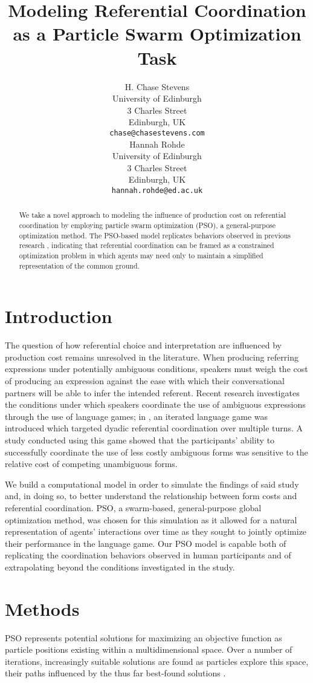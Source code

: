 \documentclass[a4paper,11pt]{article}
\title{Modeling Referential Coordination as a Particle Swarm Optimization Task}
\author{H. Chase Stevens \\
  University of Edinburgh \\
  3 Charles Street \\
  Edinburgh, UK \\
  {\tt chase@chasestevens.com} \\\And
  Hannah Rohde \\
  University of Edinburgh \\
  3 Charles Street \\
  Edinburgh, UK \\
  {\tt hannah.rohde@ed.ac.uk} \\}
\date{}
\begin{document}
\maketitle
\begin{abstract}
We take a novel approach to modeling the influence of production cost on referential coordination by employing particle swarm optimization (PSO), a general-purpose optimization method. The PSO-based model replicates behaviors observed in previous research \cite{rohde2012,brennan1996}, indicating that referential coordination can be framed as a constrained optimization problem in which agents may need only to maintain a simplified representation of the common ground.
\end{abstract}

\section{Introduction}
The question of how referential choice and interpretation are influenced by production cost remains unresolved in the literature. When producing referring expressions under potentially ambiguous conditions, speakers must weigh the cost of producing an expression against the ease with which their conversational partners will be able to infer the intended referent. Recent research \cite{rohde2012,degen2012,frank2012} investigates the conditions under which speakers coordinate the use of ambiguous expressions through the use of language games; in \citeauthor{rohde2012}, an iterated language game was introduced which targeted dyadic referential coordination over multiple turns. A study conducted using this game showed that the participants' ability to successfully coordinate the use of less costly ambiguous forms was sensitive to the relative cost of competing unambiguous forms.

We build a computational model in order to simulate the findings of said study and, in doing so, to better understand the relationship between form costs and referential coordination. PSO, a swarm-based, general-purpose global optimization method, was chosen for this simulation as it allowed for a natural representation of agents' interactions over time as they sought to jointly optimize their performance in the language game. Our PSO model is capable both of replicating the coordination behaviors observed in human participants and of extrapolating beyond the conditions investigated in the \citeauthor{rohde2012} study.

\section{Methods}
PSO represents potential solutions for maximizing an objective function as particle positions existing within a multidimensional space. Over a number of iterations, increasingly suitable solutions are found as particles explore this space, their paths influenced by the thus far best-found solutions \cite{kennedy1995}.
\end{document}
